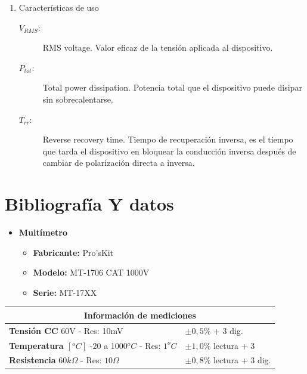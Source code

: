 \begin{enumerate}
		\item Características de uso

		\begin{description}
		\item[$V_{RMS}$:] RMS voltage. Valor eficaz de la tensión aplicada al dispositivo.
		\item[$P_{tot}$:] Total power dissipation. Potencia total que el dispositivo puede disipar sin sobrecalentarse.
		\item[$T_{rr}$:] Reverse recovery time. Tiempo de recuperación inversa, es el tiempo que tarda el dispositivo en bloquear la conducción inversa después de cambiar de polarización directa a inversa.
		\end{description}

	\end{enumerate}

\newpage

\par\vspace{10pt}\par
\section{Bibliografía Y datos}

\begin{itemize}

\item \textbf{Multímetro}
\begin{itemize}
\item \textbf{Fabricante:} Pro'sKit
\item \textbf{Modelo:} MT-1706 CAT 1000V
\item \textbf{Serie:} MT-17XX
\end{itemize}

\end{itemize}


\begin{center}
\begin{tabular}{| m{4cm}| m{3cm} |}
\hline
\multicolumn{2}{|c|}{\textbf{Información de mediciones}} \\
\hline
\textbf{Tensión CC} 60V - Res: 10mV & $\pm 0,5\%$ + $3$ dig. \\
\hline
\textbf{Temperatura $[^oC]$} -20 a 1000$^oC$ - Res: $1^oC$ & $\pm1,0\%$ lectura + $3$ \\
\hline
\textbf{Resistencia} $60k\Omega$ - Res: $10\Omega$ & $\pm 0,8\%$ lectura + $3$ dig. \\
\hline
\end{tabular}
\end{center}


